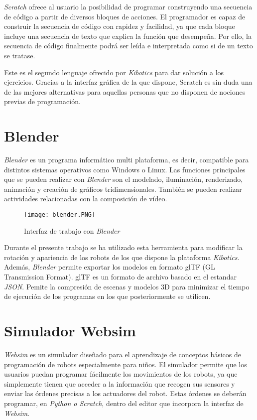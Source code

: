 \textit{Scratch} ofrece al usuario la posibilidad de programar construyendo una secuencia de código a partir de diversos bloques de acciones. El programador es capaz de construir la secuencia de código con rapidez y facilidad, ya que cada bloque incluye una secuencia de texto que explica la función que desempeña. Por ello, la secuencia de código finalmente podrá ser leída e interpretada como si de un texto se tratase. \newline

Este es el segundo lenguaje ofrecido por \textit{Kibotics} para dar solución a los ejercicios. Gracias a la interfaz gráfica de la que dispone, Scratch es sin duda una de las mejores alternativas para aquellas personas que no disponen de nociones previas de programación.

\section{Blender}
\textit{Blender} es un programa informático multi plataforma, es decir, compatible para distintos sistemas operativos como Windows o Linux. Las funciones principales que se pueden realizar con \textit{Blender} son el modelado, iluminación, renderizado, animación y creación de gráficos tridimensionales. También se pueden realizar actividades relacionadas con la composición de vídeo. 

\begin{figure}[h!]
    \centering
    \texttt{[image: blender.PNG]} 
    \caption{Interfaz de trabajo con \textit{Blender}}
    \label{fig:blender}
\end{figure}

Durante el presente trabajo se ha utilizado esta herramienta para modificar la rotación y apariencia de los robots de los que dispone la plataforma \textit{Kibotics}. Además, \textit{Blender} permite exportar los modelos en formato glTF (GL Transmission Format). glTF es un formato de archivo basado en el estandar \textit{JSON}. Pemite la compresión de escenas y modelos 3D para minimizar el tiempo de ejecución de los programas en los que posteriormente se utilicen.

\section{Simulador Websim}
\textit{Websim} es un simulador diseñado para el aprendizaje de conceptos básicos de programación de robots especialmente para niños. El simulador permite que los usuarios puedan programar fácilmente los movimientos de los robots, ya que simplemente tienen que acceder a la información que recogen sus sensores y enviar las órdenes precisas a los actuadores del robot. Estas órdenes se deberán programar, en\textit{ Python o Scratch}, dentro del editor que incorpora la interfaz de \textit{Websim}. \newline

